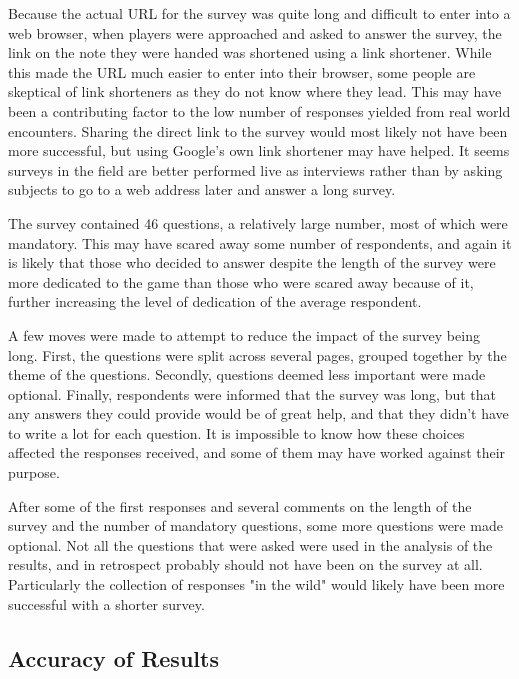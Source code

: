 Because the actual URL for the survey was quite long and difficult to enter into a web browser, when players were approached and asked to answer the survey, the link on the note they were handed was shortened using a link shortener. While this made the URL much easier to enter into their browser, some people are skeptical of link shorteners as they do not know where they lead. This may have been a contributing factor to the low number of responses yielded from real world encounters. Sharing the direct link to the survey would most likely not have been more successful, but using Google's own link shortener may have helped. It seems surveys in the field are better performed live as interviews rather than by asking subjects to go to a web address later and answer a long survey.

The survey contained 46 questions, a relatively large number, most of which were mandatory. This may have scared away some number of respondents, and again it is likely that those who decided to answer despite the length of the survey were more dedicated to the game than those who were scared away because of it, further increasing the level of dedication of the average respondent.

A few moves were made to attempt to reduce the impact of the survey being long. First, the questions were split across several pages, grouped together by the theme of the questions. Secondly, questions deemed less important were made optional. Finally, respondents were informed that the survey was long, but that any answers they could provide would be of great help, and that they didn't have to write a lot for each question. It is impossible to know how these choices affected the responses received, and some of them may have worked against their purpose.

After some of the first responses and several comments on the length of the survey and the number of mandatory questions, some more questions were made optional. Not all the questions that were asked were used in the analysis of the results, and in retrospect probably should not have been on the survey at all. Particularly the collection of responses "in the wild" would likely have been more successful with a shorter survey. 

\subsection{Accuracy of Results}

